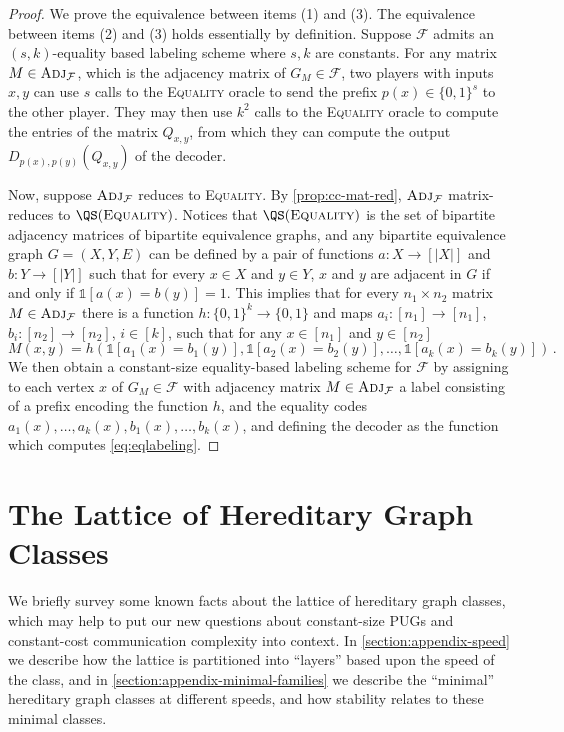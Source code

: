 \documentclass{theoretics}
\newcommand{\ind}[1]{\mathds{1} \left[ #1 \right] }
\newcommand{\zo}{\{0,1\}}
\newcommand{\cF}{\ensuremath{\mathcal{F}}}
\newcommand{\Adj}{\textsc{Adj}}
\newcommand*\EQUALITY{\textsc{Equality}\xspace}
\begin{document}
\lemmaeqlabeling*
\begin{proof}
We prove the equivalence between items (1) and (3). The equivalence between items (2) and (3) holds
essentially by definition.  Suppose $\cF$ admits an $(s,k)$-equality based labeling scheme where
$s,k$ are constants. For any matrix $M \in \Adj_\cF$, which is the adjacency matrix of $G_M \in
\cF$, two players with inputs $x,y$ can use $s$ calls to the \EQUALITY oracle to send the prefix
$p(x) \in \zo^s$ to the other player. They may then use $k^2$ calls to the \EQUALITY oracle to
compute the entries of the matrix $Q_{x,y}$, from which they can compute the output
$D_{p(x),p(y)}(Q_{x,y})$ of the decoder.

Now, suppose $\Adj_\cF$ reduces to \EQUALITY. By \cref{prop:cc-mat-red}, $\Adj_\cF$ matrix-reduces to $\QS(\EQUALITY)$. Notices that $\QS(\EQUALITY)$ is the set of bipartite adjacency matrices of bipartite equivalence graphs, and any bipartite equivalence graph $G=(X,Y,E)$ can be defined by a pair of functions $a : X \rightarrow [|X|]$ and $b : Y \rightarrow [|Y|]$ such that for every $x \in X$ and $y \in Y$, $x$ and $y$ are adjacent in $G$ if and only if $\ind{a(x)=b(y)}=1$.
This implies that for every $n_1 \times n_2$ matrix $M \in \Adj_\cF$ there is a function $h : \zo^k \to \zo$ and maps $a_i : [n_1] \to [n_1]$, $b_i :[n_2] \to [n_2]$, $i \in [k]$, such that for any $x \in [n_1]$ and $y \in [n_2]$
\begin{equation}
	\label{eq:eqlabeling}
	M(x,y) = h(\ind{a_1(x) = b_1(y)} , \ind{a_2(x) = b_2(y)}, \dotsc, \ind{a_k(x) = b_k(y)}) \,.
\end{equation}
%
We then obtain a constant-size equality-based labeling scheme for $\cF$ by assigning to each vertex
$x$ of $G_M \in \cF$ with adjacency matrix $M \in \Adj_\cF$ a label consisting of a prefix encoding the function $h$, and the equality codes $a_1(x), \dotsc,a_k(x), b_1(x), \dotsc, b_k(x)$, and defining the decoder as the function which computes
\cref{eq:eqlabeling}.%
\end{proof}

\section{The Lattice of Hereditary Graph Classes}
\label{section:graph theory}

We briefly survey some known facts about the lattice of hereditary graph classes, which may help to
put our new questions about constant-size PUGs and constant-cost communication complexity into
context. In \cref{section:appendix-speed} we describe how the lattice is partitioned into ``layers''
based upon the speed of the class, and in \cref{section:appendix-minimal-families} we describe the
``minimal'' hereditary graph classes at different speeds, and how stability relates to these minimal
classes.
\end{document}
